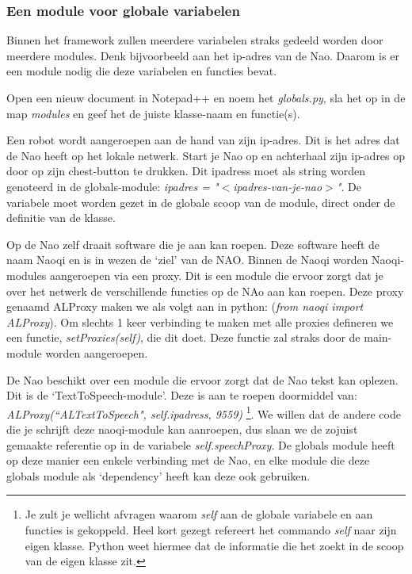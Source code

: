 \documentclass[a4paper]{article}
\begin{document}
\subsubsection{Een module voor globale variabelen}
Binnen het framework zullen meerdere variabelen straks gedeeld worden door meerdere modules. Denk bijvoorbeeld aan het ip-adres van de Nao. Daarom is er een module nodig die deze variabelen en functies bevat.

Open een nieuw document in Notepad++ en noem het \textit{globals.py}, sla het op in de map \textit{modules} en geef het de juiste klasse-naam en functie(s). 

Een robot wordt aangeroepen aan de hand van zijn ip-adres. Dit is het adres dat de Nao heeft op het lokale netwerk. Start je Nao op en achterhaal zijn ip-adres op door op zijn chest-button te drukken. Dit ipadress moet als string worden genoteerd in de globals-module: \textit{ ipadres = "$<$ipadres-van-je-nao$>$"}. De variabele moet worden gezet in de globale scoop van de module, direct onder de definitie van de klasse.

Op de Nao zelf draait software die je aan kan roepen. Deze software heeft de naam Naoqi en is in wezen de `ziel' van de NAO.
Binnen de Naoqi worden Naoqi-modules aangeroepen via een proxy. Dit is een module die ervoor zorgt dat je over het netwerk de verschillende functies op de NAo aan kan roepen. Deze proxy genaamd ALProxy maken we als volgt aan in python: (\textit{from naoqi import ALProxy}). Om slechts 1 keer verbinding te maken met alle proxies defineren we een functie, \textit{setProxies(self)}, die dit doet. Deze functie zal straks door de main-module worden aangeroepen.

De Nao beschikt over een module die ervoor zorgt dat de Nao tekst kan oplezen. Dit is de `TextToSpeech-module'. Deze is aan te roepen doormiddel van: \textit{ALProxy(``ALTextToSpeech", self.ipadress, 9559)} \footnote{Je zult je wellicht afvragen waarom \textit{self} aan de globale variabele en aan functies is gekoppeld. Heel kort gezegt refereert het commando \textit{self} naar zijn eigen klasse. Python weet hiermee dat de informatie die het zoekt in de scoop van de eigen klasse zit.}. We willen dat de andere code die je schrijft deze naoqi-module kan aanroepen, dus slaan we de zojuist gemaakte referentie op in de variabele \textit{self.speechProxy}. De globals module heeft op deze manier een enkele verbinding met de Nao, en elke module die deze globals module als `dependency' heeft kan deze ook gebruiken.
\end{document}
